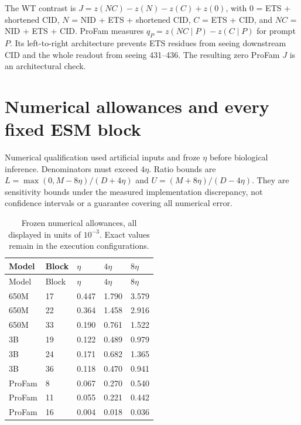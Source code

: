 \documentclass[a4paper,11pt]{scrartcl}
\begin{document}
The WT contrast is $J=z(NC)-z(N)-z(C)+z(0)$, with $0$ = ETS + shortened CID, $N$ = NID + ETS + shortened CID, $C$ = ETS + CID, and $NC$ = NID + ETS + CID. ProFam measures $q_P=z(NC\mid P)-z(C\mid P)$ for prompt $P$. Its left-to-right architecture prevents ETS residues from seeing downstream CID and the whole readout from seeing 431--436. The resulting zero ProFam $J$ is an architectural check.
\section{Numerical allowances and every fixed ESM block}
Numerical qualification used artificial inputs and froze $\eta$ before biological inference. Denominators must exceed $4\eta$. Ratio bounds are $L=\max(0,M-8\eta)/(D+4\eta)$ and $U=(M+8\eta)/(D-4\eta)$. They are sensitivity bounds under the measured implementation discrepancy, not confidence intervals or a guarantee covering all numerical error.

\begingroup\small
\begin{longtable}{@{}lllll@{}}
\caption{Frozen numerical allowances, all displayed in units of $10^{-3}$. Exact values remain in the execution configurations.}\\
\toprule Model & Block & $\eta$ & $4\eta$ & $8\eta$\\\midrule\endfirsthead
\toprule Model & Block & $\eta$ & $4\eta$ & $8\eta$\\\midrule\endhead
650M & 17 & 0.447 & 1.790 & 3.579\\
650M & 22 & 0.364 & 1.458 & 2.916\\
650M & 33 & 0.190 & 0.761 & 1.522\\
3B & 19 & 0.122 & 0.489 & 0.979\\
3B & 24 & 0.171 & 0.682 & 1.365\\
3B & 36 & 0.118 & 0.470 & 0.941\\
ProFam & 8 & 0.067 & 0.270 & 0.540\\
ProFam & 11 & 0.055 & 0.221 & 0.442\\
ProFam & 16 & 0.004 & 0.018 & 0.036\\
\bottomrule\end{longtable}
\endgroup
\end{document}
